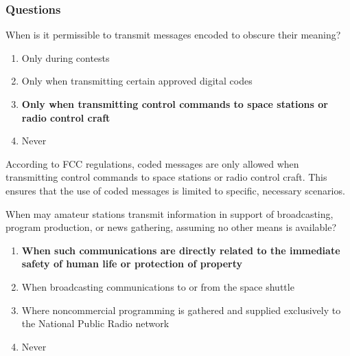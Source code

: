
\subsubsection{Questions}

\begin{tcolorbox}[colback=gray!10!white,colframe=black!75!black,title={T1D03}]
    When is it permissible to transmit messages encoded to obscure their meaning?
    \begin{enumerate}[label=\Alph*),noitemsep]
        \item Only during contests
        \item Only when transmitting certain approved digital codes
        \item \textbf{Only when transmitting control commands to space stations or radio control craft}
        \item Never
    \end{enumerate}
\end{tcolorbox}

According to FCC regulations, coded messages are only allowed when transmitting control commands to space stations or radio control craft. This ensures that the use of coded messages is limited to specific, necessary scenarios.

\begin{tcolorbox}[colback=gray!10!white,colframe=black!75!black,title={T1D09}]
    When may amateur stations transmit information in support of broadcasting, program production, or news gathering, assuming no other means is available?
    \begin{enumerate}[label=\Alph*),noitemsep]
        \item \textbf{When such communications are directly related to the immediate safety of human life or protection of property}
        \item When broadcasting communications to or from the space shuttle
        \item Where noncommercial programming is gathered and supplied exclusively to the National Public Radio network
        \item Never
    \end{enumerate}
\end{tcolorbox}

